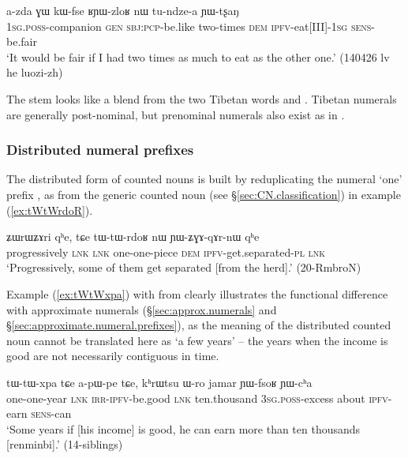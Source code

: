 \begin{exe}
\ex \label{ex:RYizloR}
\gll a-zda ɣɯ kɯ-fse ʁɲɯ-zloʁ nɯ tu-ndze-a ɲɯ-tʂaŋ \\
 \textsc{1sg}.\textsc{poss}-companion \textsc{gen} \textsc{sbj}:\textsc{pcp}-be.like two-times \textsc{dem} \textsc{ipfv}-eat[III]-\textsc{1sg} \textsc{sens}-be.fair \\
\glt `It would be fair if I had two times as much to eat as the other one.' (140426 lv he luozi-zh)
\end{exe}

The stem  looks like a blend from the two Tibetan words  and . Tibetan numerals are generally post-nominal, but prenominal numerals also exist as in .

\subsubsection{Distributed numeral prefixes} \label{sec:numeral.prefixes.distributed}
The distributed form of counted nouns is built by reduplicating the numeral `one' prefix , as  from the generic counted noun  (see §\ref{sec:CN.classification}) in example (\ref{ex:tWtWrdoR}).

\begin{exe}
\ex  \label{ex:tWtWrdoR}
\gll ʑɯrɯʑɤri qʰe, tɕe tɯ-tɯ-rdoʁ nɯ ɲɯ-ʑɣɤ-qɤr-nɯ qʰe \\
 progressively \textsc{lnk} \textsc{lnk} one-one-piece \textsc{dem} \textsc{ipfv}-get.separated-\textsc{pl} \textsc{lnk} \\
\glt `Progressively, some of them get separated [from the herd].' (20-RmbroN) 
\end{exe}

Example (\ref{ex:tWtWxpa}) with  from  clearly illustrates the functional difference with approximate numerals (§\ref{sec:approx.numerals} and §\ref{sec:approximate.numeral.prefixes}), as the meaning of the distributed counted noun cannot be translated here as `a few years' -- the years when the income is good are not necessarily contiguous in time.

\begin{exe}
\ex  \label{ex:tWtWxpa}
\gll   tɯ-tɯ-xpa tɕe a-pɯ-pe tɕe, kʰrɯtsu ɯ-ro jamar ɲɯ-fsoʁ ɲɯ-cʰa \\
one-one-year  \textsc{lnk} \textsc{irr}-\textsc{ipfv}-be.good \textsc{lnk} ten.thousand \textsc{3sg}.\textsc{poss}-excess about \textsc{ipfv}-earn \textsc{sens}-can \\ 
\glt `Some years if [his income] is good, he can earn more than ten thousands [renminbi].' (14-siblings)
\end{exe}

